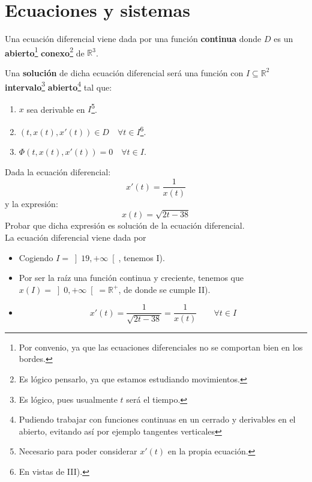 \newpage
\chapter{Ecuaciones y sistemas}

\begin{definicion}
    Una ecuación diferencial viene dada por una función
    \textbf{continua} donde $D$ es un \textbf{abierto}\footnote{Por convenio, ya que las ecuaciones diferenciales no se comportan bien en los bordes.} \textbf{conexo}\footnote{Es lógico pensarlo, ya que estamos estudiando movimientos.} de $\mathbb{R}^3$.

\noindent
Una \textbf{solución} de dicha ecuación diferencial será una función
con $I\subseteq \mathbb{R}^2$ \textbf{intervalo}\footnote{Es lógico, pues usualmente $t$ será el tiempo.} \textbf{abierto}\footnote{Pudiendo trabajar con funciones continuas en un cerrado y derivables en el abierto, evitando así por ejemplo tangentes verticales} tal que:
\begin{enumerate}[label=\roman*)]
    \item $x$ sea derivable en $I$\footnote{Necesario para poder considerar $x'(t)$ en la propia ecuación.}.
    \item $(t,x(t),x'(t)) \in D \quad\forall t\in I$\footnote{En vistas de III).}.
    \item $\Phi(t,x(t),x'(t))=0 \quad \forall t\in I$.
\end{enumerate}
\end{definicion}

\begin{ejemplo}
    Dada la ecuación diferencial:
    \begin{equation*}
        x'(t) = \dfrac{1}{x(t)}
    \end{equation*}
    y la expresión:
    \begin{equation*}
        x(t) = \sqrt{2t-38}
    \end{equation*}
    Probar que dicha expresión es solución de la ecuación diferencial.\\

    La ecuación diferencial viene dada por
    \begin{itemize}
        \item Cogiendo $I = \left]19, +\infty\right[$, tenemos I).
        \item Por ser la raíz una función continua y creciente, tenemos que ${x(I) = \left]0,+\infty\right[=\mathbb{R}^+}$, de donde se cumple II).
        \item 
            \begin{equation*}
                x'(t) = \dfrac{1}{\sqrt{2t-38}} = \dfrac{1}{x(t)} \qquad \forall t\in I
            \end{equation*}
    \end{itemize}
\end{ejemplo}

